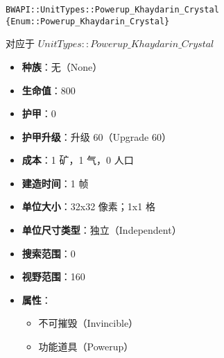 \begin{tcolorbox}[colback=white, colframe=black!60!white, title=Powerup\_Khaydarin\_Crystal(), arc=0mm]
    \begin{verbatim}
BWAPI::UnitTypes::Powerup_Khaydarin_Crystal {Enum::Powerup_Khaydarin_Crystal}
    \end{verbatim}
    对应于  $UnitTypes::Powerup\_Khaydarin\_Crystal$ 
    \begin{itemize}
        \item \textbf{种族}：无（None）
        \item \textbf{生命值}：800
        \item \textbf{护甲}：0
        \item \textbf{护甲升级}：升级 60（Upgrade 60）
        \item \textbf{成本}：1 矿，1 气，0 人口
        \item \textbf{建造时间}：1 帧
        \item \textbf{单位大小}：32x32 像素；1x1 格
        \item \textbf{单位尺寸类型}：独立（Independent）
        \item \textbf{搜索范围}：0
        \item \textbf{视野范围}：160
        \item \textbf{属性}：
            \begin{itemize}
                \item 不可摧毁（Invincible）
                \item 功能道具（Powerup）
            \end{itemize}
    \end{itemize}
\end{tcolorbox}

